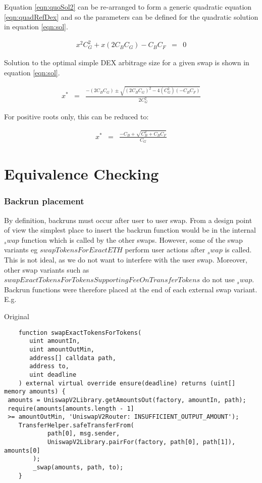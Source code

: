 \documentclass[runningheads]{llncs}
\begin{document}
Equation \ref{eqn:quoSol2} can be re-arranged to form a generic quadratic equation \ref{eqn:quadRefDex} and so the parameters can be defined for the quadratic solution in equation \ref{eqn:sol}.

\begin{eqnarray}
	x^2 C_{G}^2 + x(2 C_{B} C_{G}) - C_{B} C_{F} &=& 0 \label{eqn:quadRefDex}
\end{eqnarray}

Solution to the optimal simple DEX arbitrage size for a given swap is shown in equation \ref{eqn:sol}.

\begin{eqnarray}
	x^* &=& \frac{-(2 C_{B} C_{G}) \pm \sqrt{(2 C_{B} C_{G})^2 - 4(C_{G}^2)(- C_{B} C_{F})}}{2 C_{G}^2} \label{eqn:sol}
\end{eqnarray}

For positive roots only, this can be reduced to:

\begin{eqnarray}
	x^* &=& \frac{- C_{B} + \sqrt{C_{B} ^2 + C_{B} C_{F}}}{C_{G}} \label{eqn:sol2}
\end{eqnarray}


\chapter{Equivalence Checking}

\subsection{Backrun placement}

By definition, backruns must occur after user to user swap. From a design point of view the simplest place to insert the backrun function would be in the internal $_swap$ function which is called by the other swaps. However, some of the swap variants eg $swapTokensForExactETH$ perform user actions after $_swap$ is called. This is not ideal, as we do not want to interfere with the user swap. Moreover, other swap variants such as $swapExactTokensForTokensSupportingFeeOnTransferTokens$ do not use $_swap$. Backrun functions were therefore placed at the end of each external swap variant. E.g.

Original
\label{Before swapExactTokensforTokens:1}
\begin{verbatim}
    function swapExactTokensForTokens(
       uint amountIn,
       uint amountOutMin,
       address[] calldata path,
       address to,
       uint deadline
    ) external virtual override ensure(deadline) returns (uint[] memory amounts) {
 amounts = UniswapV2Library.getAmountsOut(factory, amountIn, path);
 require(amounts[amounts.length - 1] 
 >= amountOutMin, 'UniswapV2Router: INSUFFICIENT_OUTPUT_AMOUNT');
    TransferHelper.safeTransferFrom(
            path[0], msg.sender, 
            UniswapV2Library.pairFor(factory, path[0], path[1]), amounts[0]
        );
        _swap(amounts, path, to);
    }
\end{verbatim}
\end{document}
